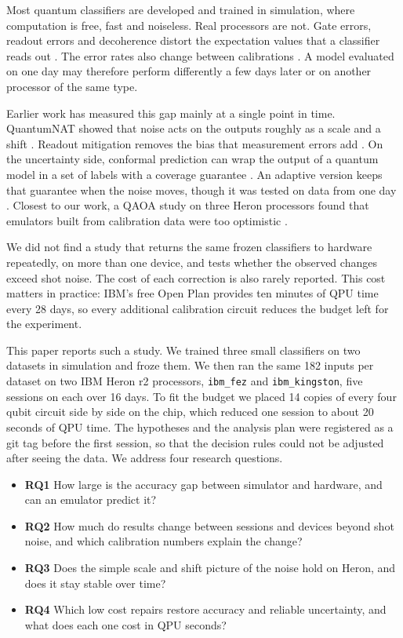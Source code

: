 \documentclass[10pt,conference]{IEEEtran}
\begin{document}
Most quantum classifiers are developed and trained in simulation, where computation is free, fast
and noiseless. Real processors are not. Gate errors, readout errors and decoherence distort the
expectation values that a classifier reads out \cite{wang2021nibp,heyraud2022noisykernels}. The error rates also change between calibrations \cite{realtimecal2023}. A model evaluated on one
day may therefore perform differently a few days later or on another processor of the same type.

Earlier work has measured this gap mainly at a single point in time. QuantumNAT showed that
noise acts on the outputs roughly as a scale and a shift \cite{wang2022quantumnat}. Readout
mitigation removes the bias that measurement errors add \cite{nation2021m3,vandenberg2022trex}.
On the uncertainty side, conformal prediction can wrap the output of a quantum model in a set of
labels with a coverage guarantee \cite{park2023qcp}. An adaptive version keeps that guarantee when
the noise moves, though it was tested on data from one day \cite{spencer2026aqcp}. Closest to our
work, a QAOA study on three Heron processors found that emulators built from calibration data were
too optimistic \cite{qaoa2026drift}.

We did not find a study that returns the same frozen classifiers to hardware repeatedly, on more
than one device, and tests whether the observed changes exceed shot noise. The cost of each
correction is also rarely reported. This cost matters in practice: IBM's free Open Plan provides
ten minutes of QPU time every 28 days, so every additional calibration circuit reduces the budget
left for the experiment.

This paper reports such a study. We trained three small classifiers on two datasets in simulation
and froze them. We then ran the same 182 inputs per dataset on two IBM Heron r2 processors,
\texttt{ibm\_fez} and \texttt{ibm\_kingston}, five sessions on each over 16 days. To fit the budget we placed 14 copies of every four qubit circuit side by side on the chip, which
reduced one session to about 20 seconds of QPU time. The hypotheses and the analysis plan were
registered as a git tag before the first session, so that the decision rules could not be adjusted
after seeing the data. We address four research questions.

\begin{itemize}
\item \textbf{RQ1} How large is the accuracy gap between simulator and hardware, and can an emulator
predict it?
\item \textbf{RQ2} How much do results change between sessions and devices beyond shot noise, and
which calibration numbers explain the change?
\item \textbf{RQ3} Does the simple scale and shift picture of the noise hold on Heron, and does it
stay stable over time?
\item \textbf{RQ4} Which low cost repairs restore accuracy and reliable uncertainty, and what does
each one cost in QPU seconds?
\end{itemize}
\end{document}
